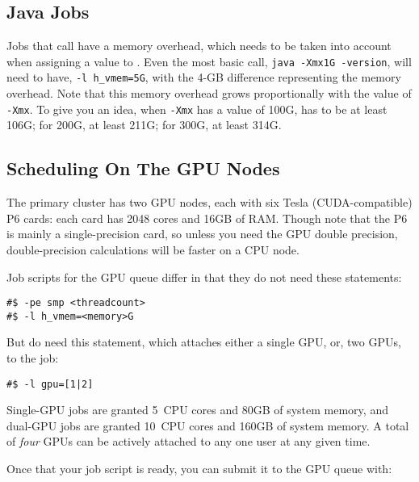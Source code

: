 \documentclass{easychair}
\begin{document}
\subsection{Java Jobs}

Jobs that call  have a memory overhead, which needs to be taken 
into account when assigning a value to . Even the most basic 
 call, \texttt{java -Xmx1G -version}, will need to have,
\texttt{-l h\_vmem=5G}, with the 4-GB difference representing the memory overhead. 
Note that this memory overhead grows proportionally with the value of
\texttt{-Xmx}. To give you an idea, when \texttt{-Xmx} has a value of 100G,
 has to be at least 106G; for 200G, at least 211G; for 300G, at least 314G.


\subsection{Scheduling On The GPU Nodes}

The primary cluster has two GPU nodes, each with six Tesla (CUDA-compatible) P6
cards: each card has 2048 cores and 16GB of RAM. Though note that the P6
is mainly a single-precision card, so unless you need the GPU double
precision, double-precision calculations will be faster on a CPU node.

Job scripts for the GPU queue differ in that they do not need these
statements:

\begin{verbatim}
#$ -pe smp <threadcount>
#$ -l h_vmem=<memory>G
\end{verbatim}

But do need this statement, which attaches either a single GPU, or, two
GPUs, to the job:

\begin{verbatim}
#$ -l gpu=[1|2]
\end{verbatim}

Single-GPU jobs are granted 5~CPU cores and 80GB of system memory, and
dual-GPU jobs are granted 10~CPU cores and 160GB of system memory. A
total of \emph{four} GPUs can be actively attached to any one user at any given
time.

Once that your job script is ready, you can submit it to the GPU queue
with:
\end{document}
